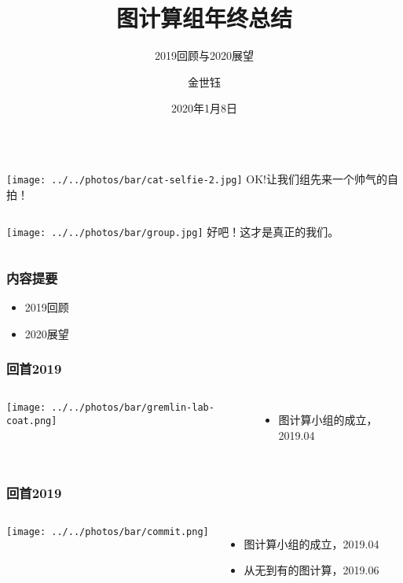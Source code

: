 \documentclass{beamer}
\title[总结]{图计算组年终总结}
\subtitle{2019回顾与2020展望}
\author{金世钰}
\date{2020年1月8日}
\begin{document}
\maketitle

  \begin{frame}
      \begin{columns}
       \texttt{[image: ../../photos/bar/cat-selfie-2.jpg]}
         OK!让我们组先来一个帅气的自拍！
      \end{columns}
  \end{frame}
  \begin{frame}
      \begin{columns}
       \texttt{[image: ../../photos/bar/group.jpg]}
        好吧！这才是真正的我们。
      \end{columns}
  \end{frame}

  \begin{frame}
  \frametitle{内容提要}
    \begin{itemize}
      \item{2019回顾}
      \item{2020展望}
    \end{itemize}
  \end{frame}
  
  \begin{frame}
    \frametitle{回首2019}
  \begin{columns}
  \texttt{[image: ../../photos/bar/gremlin-lab-coat.png]}

  \begin{itemize}
  \item 图计算小组的成立，2019.04
  \end{itemize}
  \end{columns}

  \end{frame}
  
  \begin{frame}
    \frametitle{回首2019}
  \begin{columns}
  \texttt{[image: ../../photos/bar/commit.png]}

  \begin{itemize}
  \item 图计算小组的成立，2019.04
  \item 从无到有的图计算，2019.06
  \end{itemize}
  \end{columns}
  \end{frame}
\end{document}
